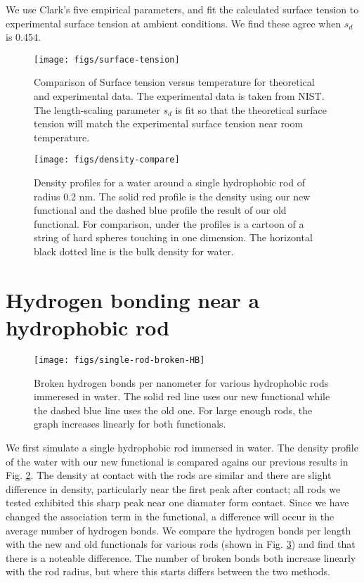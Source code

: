 \documentclass[twocolumn,amsmath,amssymb,prl]{revtex4-1}
\newcommand\lscale{\ensuremath{s_d}}
\begin{document}
We use Clark's five empirical parameters, and fit the calculated
surface tension to experimental surface tension at ambient conditions.
We find these agree when $\lscale$ is 0.454.

\begin{figure}
\begin{center}
\texttt{[image: figs/surface-tension]}
\end{center}
\caption{Comparison of Surface tension versus temperature for theoretical and
  experimental data. The experimental data is taken from NIST.\cite{nistwater}
  The length-scaling parameter $\lscale$ is fit so that the theoretical surface 
  tension will match the experimental surface tension near room temperature.}
\label{fig:surface-tension}
\end{figure}

\begin{figure}
\begin{center}
\texttt{[image: figs/density-compare]}
\end{center}
\caption{ Density profiles for a water around a single hydrophobic
  rod of radius 0.2 nm. The solid red profile is the density using our new functional
  and the dashed blue profile the result of our old functional.  For
  comparison, under the profiles is a cartoon of a string of hard
  spheres touching in one dimension. The horizontal black dotted line
  is the bulk density for water.}
\label{fig:density-single-rod}
\end{figure}

\section{Hydrogen bonding near a hydrophobic rod}

\begin{figure}
\begin{center}
\texttt{[image: figs/single-rod-broken-HB]}
\end{center}
\caption{Broken hydrogen bonds per nanometer for various hydrophobic rods
  immeresed in water.  The solid red line uses our new functional
  while the dashed blue line uses the old one. For large enough rods,
  the graph increases linearly for both functionals.}
\label{fig:single-rod-broken-HB}
\end{figure}

We first simulate a single hydrophobic rod immersed in water. The
density profile of the water with our new functional is compared
agains our previous results in Fig. \ref{fig:density-single-rod}. The
density at contact with the rods are similar and there are slight
difference in density, particularly near the first peak after contact;
all rods we tested exhibited this sharp peak near one diamater form
contact. Since we have changed the association term in the functional,
a difference will occur in the average number of hydrogen bonds. We
compare the hydrogen bonds per length with the new and old functionals
for various rods (shown in Fig. \ref{fig:single-rod-broken-HB}) and
find that there is a noteable difference. The number of broken bonds
both increase linearly with the rod radius, but where this starts
differs between the two methods.
\end{document}
